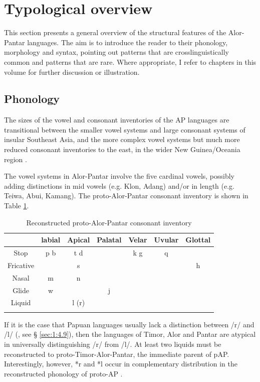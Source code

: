 \section{Typological overview}\label{sec:1:5}

This section presents a general overview of the structural features of the Alor-Pantar languages. The aim is to introduce the reader to their phonology, morphology and syntax, pointing out patterns that are crosslinguistically common and patterns that are rare. Where appropriate, I refer to chapters in this volume for further discussion or illustration. 

\subsection{Phonology}\label{sec:1:5.1}
The sizes of the vowel and consonant inventories of the AP languages are transitional between the smaller vowel systems and large consonant systems of insular Southeast Asia, and the more complex vowel systems but much more reduced consonant inventories to the east, in the wider New Guinea/Oceania region \citep[cf.][]{Hajek2010}.

The vowel systems in Alor-Pantar involve the five cardinal vowels, possibly adding distinctions in mid vowels (e.g. Klon, Adang) and/or in length (e.g. Teiwa, Abui, Kamang). The proto-Alor-Pantar consonant inventory \citep{HoltonEtAl2012,HoltonRobinsonTVhistory} is shown in Table \ref{tab:1:3}.



\begin{table}\centering 
\begin{tabular}{ccccccc} 
\mytoprule
& {labial} & {Apical} & {Palatal} & {Velar} & {Uvular} & {Glottal}\\
\midrule 
{Stop} & {p  b} & {t  d} &  & {k  g} & {q} & \\
{Fricative} &  & {s} &  &  &  & {h}\\
{Nasal} & {m} & {n} &  &  &  & \\
{Glide} & {w} &  & {j} &  &  & \\
{Liquid} &  & {l (r)} &  &  &  & \\
\mybottomrule
\end{tabular}
\caption{Reconstructed proto-Alor-Pantar consonant inventory}
\label{tab:1:3}
\end{table}

If it is the case that Papuan languages usually lack a distinction between /r/ and /l/ (\citealt{Foley1986}, see {\S} \ref{sec:1:4.9}), then the languages of Timor, Alor and Pantar are atypical in universally distinguishing /r/ from /l/. At least two liquids must be reconstructed to proto-Timor-Alor-Pantar, the immediate parent of pAP. Interestingly, however, *r and *l occur in complementary distribution in the reconstructed phonology of proto-AP \citep{HoltonEtAl2012}. 

